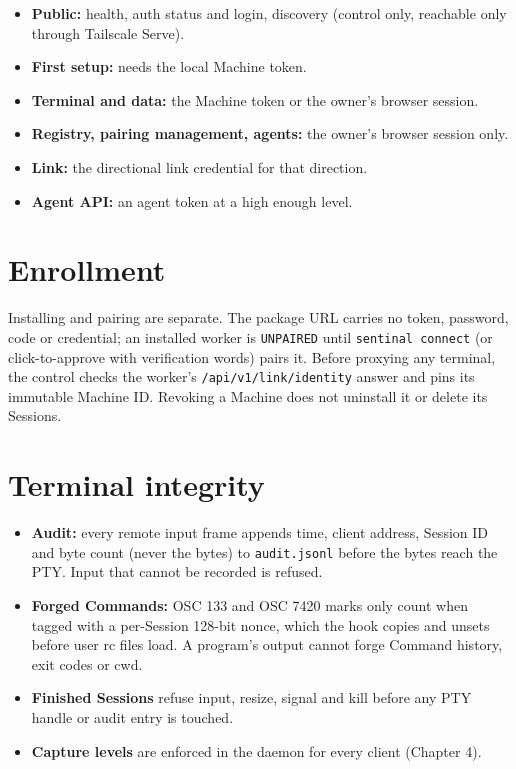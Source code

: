 \begin{itemize}
\item \textbf{Public:} health, auth status and login, discovery (control only, reachable only through Tailscale Serve).
\item \textbf{First setup:} needs the local Machine token.
\item \textbf{Terminal and data:} the Machine token or the owner's browser session.
\item \textbf{Registry, pairing management, agents:} the owner's browser session only.
\item \textbf{Link:} the directional link credential for that direction.
\item \textbf{Agent API:} an agent token at a high enough level.
\end{itemize}

\section{\texorpdfstring{Enrollment}{Enrollment}}

Installing and pairing are separate. The package URL carries no token, password, code or credential; an installed worker is \texttt{UNPAIRED} until \texttt{sentinal\ connect} (or click-to-approve with verification words) pairs it. Before proxying any terminal, the control checks the worker's \texttt{/\allowbreak{}api/\allowbreak{}v1/\allowbreak{}link/\allowbreak{}identity} answer and pins its immutable Machine ID. Revoking a Machine does not uninstall it or delete its Sessions.

\section{\texorpdfstring{Terminal integrity}{Terminal integrity}}

\begin{itemize}
\item \textbf{Audit:} every remote input frame appends time, client address, Session ID and byte count (never the bytes) to \texttt{audit.\allowbreak{}jsonl} before the bytes reach the PTY. Input that cannot be recorded is refused.
\item \textbf{Forged Commands:} OSC 133 and OSC 7420 marks only count when tagged with a per-Session 128-bit nonce, which the hook copies and unsets before user rc files load. A program's output cannot forge Command history, exit codes or cwd.
\item \textbf{Finished Sessions} refuse input, resize, signal and kill before any PTY handle or audit entry is touched.
\item \textbf{Capture levels} are enforced in the daemon for every client (Chapter 4).
\end{itemize}

